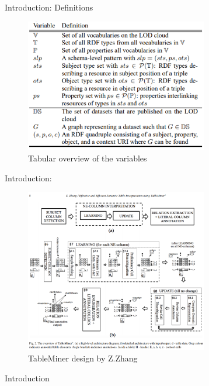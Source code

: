 \documentclass{beamer}
\begin{document}
\begin{frame}{Introduction: Definitions}
  	\begin{figure}
		\includegraphics[width=8cm]{images/definition-slp.png}
		\caption{\label{fig:your-figure2} Tabular overview of the variables}
	\end{figure}
\end{frame}

\begin{frame}{Introduction: }
	\begin{figure}
		\includegraphics[width=8cm]{images/TableMiner.png}
		\caption{\label{fig:your-figure2} TableMiner design by Z.Zhang}
	\end{figure}
\end{frame}

\begin{frame}{Introduction}
\end{frame}
\end{document}
